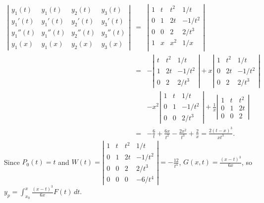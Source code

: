\documentclass{ximera}
\begin{document}
\begin{problem}
\begin{solution}
\begin{eqnarray*}
\left|\begin{array}{crcc}
y_1(t)&y_1(t)&y_2(t)&y_3(t)\\
y_1'(t)&y_1'(t)&y_2'(t)&y_3'(t)\\
y_1''(t)&y_1''(t)&y_2''(t)&y_3''(t)\\
y_1(x)&y_1(x)&y_2(x)&y_3(x)
\end{array}\right|&=&
\left|\begin{array}{cccc}
1&t&t^2&1/t\\
0&1&2t&-1/t^2\\
0&0&2&2/t^3\\
1&x&x^2&1/x\\
\end{array}\right|\\
&=&-\left|\begin{array}{cccc}
t&t^2&1/t\\
1&2t&-1/t^2\\
0&2&2/t^3\end{array}\right|
+x\left|\begin{array}{cccc}
1&t^2&1/t\\
0&2t&-1/t^2\\
0&2&2/t^3
\end{array}\right|\\
&&-x^2\left|\begin{array}{cccc}
1&t&1/t\\0&1&-1/t^2\\
0&0&2/t^3\end{array}\right|
+\frac{1}{x}\left|\begin{array}{cccc}
1&t&t^2\\0&1&2t\\0&0&2\end{array}\right|\\
&=&-\frac{6}{t}+\frac{6x}{t^2}-\frac{2x^2}{t^3}+\frac{2}{x}
=\frac{2(t-x)^3}{xt^3}.
\end{eqnarray*}
Since $P_0(t)=t$ and
$W(t)=\left|\begin{array}{cccc}
1&t&t^2&1/t\\
0&1&2t&-1/t^2\\
0&0&2&2/t^3\\
0&0&0&-6/t^4
\end{array}\right|=-\frac{12}{t^4}$,
$G(x,t)=\frac{(x-t)^3}{6x}$, so
$y_p=\int_{x_0}^x \frac{(x-t)^3}{6x}F(t)\,dt$.
\end{solution}
\end{problem}
\end{document}
